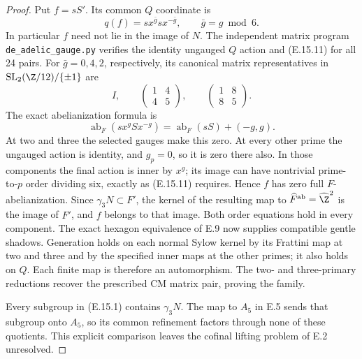 \begin{proof}
Put $f=sS'$. Its common $Q$ coordinate is
\[
             q(f)=s x^{\bar g}s x^{-\bar g},
             \qquad \bar g=g\bmod6.
 \tag{E.15.11}
\]
In particular $f$ need not lie in the image of $N$.
The independent matrix program
\texttt{de\_adelic\_gauge.py} verifies the identity
ungauged $Q$ action and (E.15.11) for all 24 pairs.
For $\bar g=0,4,2$, respectively, its canonical matrix
representatives in $\mathrm{SL}_2(\Z/12)/\{\pm1\}$ are
\[
 I,\qquad
 \begin{pmatrix}1&4\\4&5\end{pmatrix},\qquad
 \begin{pmatrix}1&8\\8&5\end{pmatrix}.
\]
The exact abelianization formula is
\[
 \operatorname{ab}_F(sx^g Sx^{-g})
       =\operatorname{ab}_F(sS)+(-g,g).
 \tag{E.15.12}
\]
At two and three the selected gauges make this zero.
At every other prime the ungauged action is identity,
and $g_p=0$, so it is zero there also. In those
components the final action is inner by $x^g$; its
image can have nontrivial prime-to-$p$ order dividing
six, exactly as (E.15.11) requires. Hence $f$ has zero
full $F$-abelianization. Since $\gamma_3N\subset F'$,
the kernel of the resulting map to
$\widehat F^{\rm ab}=\widehat\Z^2$ is the image of
$\widehat F'$, and $f$ belongs to that image.
Both order equations hold in every component. The
exact hexagon equivalence of E.9 now supplies compatible
gentle shadows. Generation holds on each normal Sylow
kernel by its Frattini map at two and three and by
the specified inner maps at the other primes; it also
holds on $Q$. Each finite map is therefore an
automorphism. The two- and three-primary reductions
recover the prescribed CM matrix pair, proving the family.

Every subgroup in (E.15.1) contains $\gamma_3N$.
The map to $A_5$ in E.5 sends that subgroup onto
$A_5$, so its common refinement factors through none
of these quotients. This explicit comparison leaves
the cofinal lifting problem of E.2 unresolved.
\end{proof}

